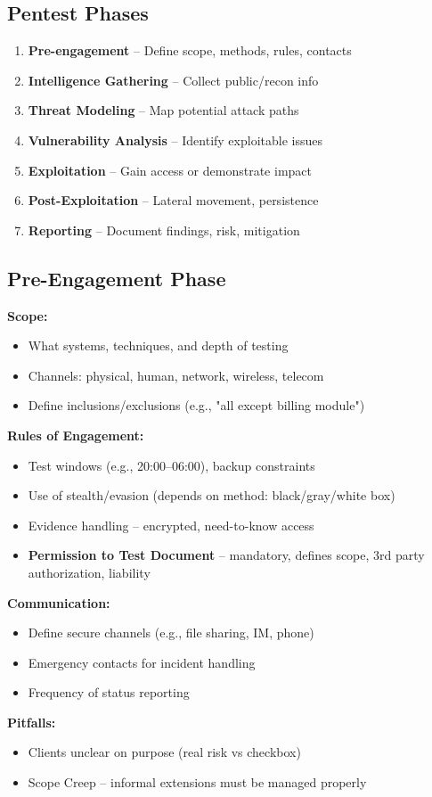 \subsection{Pentest Phases}
{
\begin{enumerate}[noitemsep]
  \item \textbf{Pre-engagement} – Define scope, methods, rules, contacts
  \item \textbf{Intelligence Gathering} – Collect public/recon info
  \item \textbf{Threat Modeling} – Map potential attack paths
  \item \textbf{Vulnerability Analysis} – Identify exploitable issues
  \item \textbf{Exploitation} – Gain access or demonstrate impact
  \item \textbf{Post-Exploitation} – Lateral movement, persistence
  \item \textbf{Reporting} – Document findings, risk, mitigation
\end{enumerate}
}

\subsection{Pre-Engagement Phase}
{
\textbf{Scope:}
\begin{itemize}[noitemsep]
  \item What systems, techniques, and depth of testing
  \item Channels: physical, human, network, wireless, telecom
  \item Define inclusions/exclusions (e.g., "all except billing module")
\end{itemize}

\textbf{Rules of Engagement:}
\begin{itemize}[noitemsep]
  \item Test windows (e.g., 20:00–06:00), backup constraints
  \item Use of stealth/evasion (depends on method: black/gray/white box)
  \item Evidence handling – encrypted, need-to-know access
  \item \textbf{Permission to Test Document} – mandatory, defines scope, 3rd party authorization, liability
\end{itemize}

\textbf{Communication:}
\begin{itemize}[noitemsep]
  \item Define secure channels (e.g., file sharing, IM, phone)
  \item Emergency contacts for incident handling
  \item Frequency of status reporting
\end{itemize}

\textbf{Pitfalls:}
\begin{itemize}[noitemsep]
  \item Clients unclear on purpose (real risk vs checkbox)
  \item Scope Creep – informal extensions must be managed properly
\end{itemize}
}

